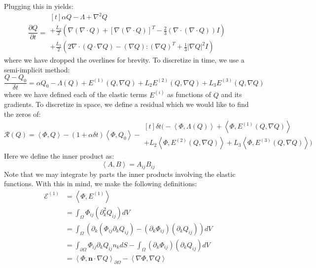 \documentclass[reqno]{article}
\begin{document}
Plugging this in yields:
\begin{equation}
    \frac{\partial Q}{\partial t}
    =
    \begin{multlined}[t]
        \alpha Q - \Lambda + \nabla^2 Q \\
        + \frac{L_2}{2} \left(
        \nabla \left( \nabla \cdot Q \right)
        + \left[ \nabla \left( \nabla \cdot Q \right) \right]^T
        - \tfrac23 \left( \nabla \cdot \left( \nabla \cdot Q \right) \right) I
        \right)\\
        + \frac{L_3}{2} \left(
        2 \nabla \cdot \left( Q \cdot \nabla Q \right)
        - \left( \nabla Q \right) : \left( \nabla Q \right)^T
        + \tfrac13 \left| \nabla Q \right|^2 I
      \right)
    \end{multlined}
\end{equation}
where we have dropped the overlines for brevity.
To discretize in time, we use a semi-implicit method:
\begin{equation}
    \frac{Q - Q_0}{\delta t}
    =
    \alpha Q_0 - \Lambda(Q) 
    + E^{(1)}(Q, \nabla Q)
    + L_2 E^{(2)}(Q, \nabla Q)
    + L_3 E^{(3)}(Q, \nabla Q)
\end{equation}
where we have defined each of the elastic terms $E^{(i)}$ as functions of $Q$ and its gradients.
To discretize in space, we define a residual which we would like to find the zeros of:
\begin{equation}
    \mathcal{R}(Q)
    =
    \left<\Phi, Q\right> 
    - \left(1 + \alpha \delta t \right) \left<\Phi, Q_0\right>
    - 
    \begin{multlined}[t]
    \delta t \bigl(
        - \left<\Phi, \Lambda(Q) \right>
        + \left<\Phi, E^{(1)}(Q, \nabla Q)\right> \\
        + L_2 \left<\Phi, E^{(2)}(Q, \nabla Q)\right>
        + L_3 \left<\Phi, E^{(3)}(Q, \nabla Q)\right>
    \bigr)
    \end{multlined}
\end{equation}
Here we define the inner product as:
\begin{equation}
    \left<A, B\right>
    =
    A_{ij} B_{ij}
\end{equation}
Note that we may integrate by parts the inner products involving the elastic functions.
With this in mind, we make the following definitions:
\begin{equation}
    \begin{split}
        \mathcal{E}^{(1)}
        &=
        \left< \Phi, E^{(1)} \right> \\
        &= \int_\Omega \Phi_{ij} (\partial_k^2 Q_{ij}) dV \\
        &= \int_\Omega \left( \partial_k \left( \Phi_{ij} \partial_k Q_{ij} \right)
        - (\partial_k \Phi_{ij}) (\partial_k Q_{ij}) \right) dV \\
        &= \int_{\partial \Omega} \Phi_{ij} \partial_k Q_{ij} n_k dS
        - \int_\Omega (\partial_k \Phi_{ij}) (\partial_k Q_{ij}) dV \\
        &=
        \left< \Phi, \mathbf{n} \cdot \nabla Q \right>_{\partial \Omega}
        - \left< \nabla \Phi, \nabla Q \right>
    \end{split}
\end{equation}
\end{document}
